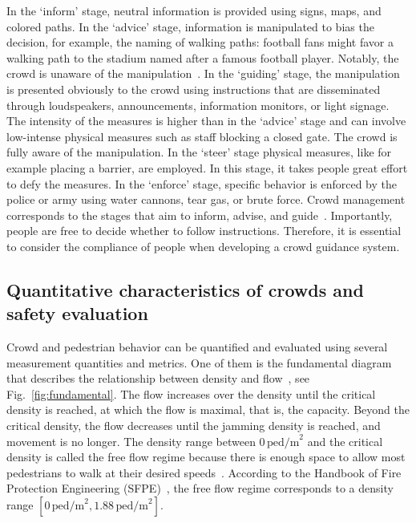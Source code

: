 In the `inform' stage, neutral information is provided using signs, maps, and colored paths. In the `advice' stage, information is manipulated to bias the decision, for example, the naming of walking paths: football fans might favor a walking path to the stadium named after a famous football player. Notably, the crowd is unaware of the manipulation~\cite[p.169]{feliciani-2021-cdyn}. 
In the `guiding' stage, the manipulation is presented obviously to the crowd using instructions that are disseminated through loudspeakers, announcements, information monitors, or light signage.  
The intensity of the measures is higher than in the `advice' stage and can involve low-intense physical measures such as staff blocking a closed gate. The crowd is fully aware of the manipulation.
In the `steer' stage physical measures, like for example placing a barrier, are employed. In this stage, it takes people great effort to defy the measures. In the `enforce' stage, specific behavior is enforced by the police or army using water cannons, tear gas, or brute force. Crowd management corresponds to the stages that aim to inform, advise, and guide~\cite{feliciani-2021-cdyn}. Importantly, people are free to decide whether to follow instructions. Therefore, it is essential to consider the compliance of people when developing a crowd guidance system.





\subsection{Quantitative characteristics of crowds and safety evaluation }
\label{sec:fundamentaldiagram}
 
Crowd and pedestrian behavior can be quantified and evaluated using several measurement quantities and metrics. One of them is the fundamental diagram that describes the relationship between density and flow~\cite{adrian-2019-cdyn}, see Fig.~\ref{fig:fundamental}. The flow increases over the density until the critical density is reached, at which the flow is maximal, that is, the capacity. Beyond the critical density, the flow decreases until the jamming density is reached, and movement is no longer.
The density range between $0\,\text{ped/m}^2$ and the critical density is called the free flow regime because there is enough space to allow most pedestrians to walk at their desired speeds~\cite{feliciani-2021-cdyn}. According to the Handbook of Fire Protection Engineering (SFPE)~\cite{hurley-2016-cdyn}, the free flow regime corresponds to a density range $[0\,\text{ped/m}^2, 1.88\,\text{ped/m}^2]$. 


